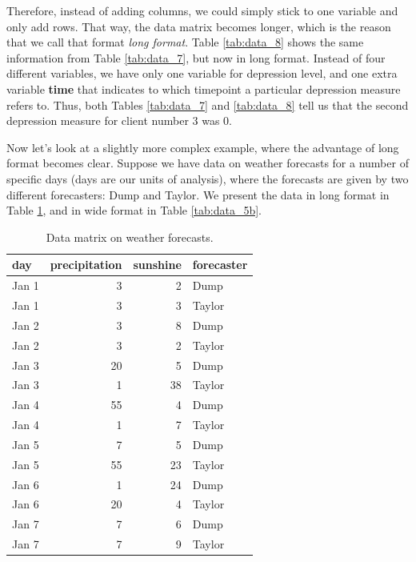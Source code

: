 \documentclass[]{book}\usepackage[]{graphicx}\usepackage[]{color}
\begin{document}
Therefore, instead of adding columns, we could simply stick to one variable and only add rows. That way, the data matrix becomes longer, which is the reason that we call that format \textit{long format}. Table \ref{tab:data_8} shows the same information from Table \ref{tab:data_7}, but now in long format. Instead of four different variables, we have only one variable for depression level, and one extra variable \textbf{time} that indicates to which timepoint a particular depression measure refers to. Thus, both Tables \ref{tab:data_7} and \ref{tab:data_8} tell us that the second depression measure for client number 3 was 0.

Now let's look at a slightly more complex example, where the advantage of long format becomes clear. Suppose we have data on weather forecasts for a number of specific days (days are our units of analysis), where the forecasts are given by two different forecasters: Dump and Taylor. We present the data in long format in Table \ref{tab:data_5}, and in wide format in Table \ref{tab:data_5b}.


\begin{table}[ht]
\centering
\caption{Data matrix on weather forecasts.} 
\label{tab:data_5}
\begin{tabular}{lrrl}
  \hline
day & precipitation & sunshine & forecaster \\ 
  \hline
Jan 1 & 3 & 2 & Dump \\ 
  Jan 1 & 3 & 3 & Taylor \\ 
  Jan 2 & 3 & 8 & Dump \\ 
  Jan 2 & 3 & 2 & Taylor \\ 
  Jan 3 & 20 & 5 & Dump \\ 
  Jan 3 & 1 & 38 & Taylor \\ 
  Jan 4 & 55 & 4 & Dump \\ 
  Jan 4 & 1 & 7 & Taylor \\ 
  Jan 5 & 7 & 5 & Dump \\ 
  Jan 5 & 55 & 23 & Taylor \\ 
  Jan 6 & 1 & 24 & Dump \\ 
  Jan 6 & 20 & 4 & Taylor \\ 
  Jan 7 & 7 & 6 & Dump \\ 
  Jan 7 & 7 & 9 & Taylor \\ 
   \hline
\end{tabular}
\end{table}
\end{document}
